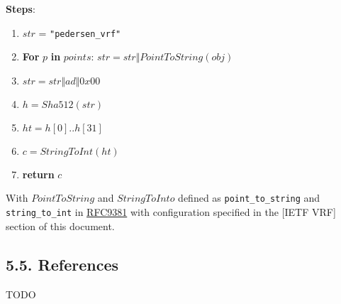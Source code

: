\documentclass[
]{article}
\providecommand{\tightlist}{%
  \setlength{\itemsep}{0pt}\setlength{\parskip}{0pt}}
\begin{document}
\textbf{Steps}:

\begin{enumerate}
\def\labelenumi{\arabic{enumi}.}
\tightlist
\item
  \(str\) = \texttt{"pedersen\_vrf"}
\item
  \textbf{For} \(p\) \textbf{in} \(points\):
  \(str = str \Vert PointToString(obj)\)
\item
  \(str = str \Vert ad \Vert 0x00\)
\item
  \(h = Sha512(str)\)
\item
  \(ht = h[0] .. h[31]\)
\item
  \(c = StringToInt(ht)\)
\item
  \textbf{return} \(c\)
\end{enumerate}

With \(PointToString\) and \(StringToInto\) defined as
\texttt{point\_to\_string} and \texttt{string\_to\_int} in
\href{https://datatracker.ietf.org/doc/rfc9381/}{RFC9381} with
configuration specified in the {[}IETF VRF{]} section of this document.

\hypertarget{references}{%
\subsection{5.5. References}\label{references}}

TODO
\end{document}
